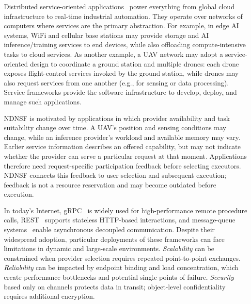 Distributed service-oriented applications~\cite{channabasavaiah2003migrating} power everything from global cloud infrastructure to real-time industrial automation.  They operate over networks of computers where services are the primary abstraction. For example, in edge AI systems, WiFi and cellular base stations may provide storage and AI inference/training services to end devices, while also offloading compute-intensive tasks to cloud services. As another example, a UAV network may adopt a service-oriented design to coordinate a ground station and multiple drones: each drone exposes flight-control services invoked by the ground station, while drones may also request services from one another (e.g., for sensing or data processing).  Service frameworks provide the software infrastructure to develop, deploy, and manage such applications.

NDNSF is motivated by applications in which provider availability and task suitability change over time. A UAV's position and sensing conditions may change, while an inference provider's workload and available memory may vary. Earlier service information describes an offered capability, but may not indicate whether the provider can serve a particular request at that moment. Applications therefore need request-specific participation feedback before selecting executors. NDNSF connects this feedback to user selection and subsequent execution; feedback is not a resource reservation and may become outdated before execution.

In today’s Internet, gRPC~\cite{grpc} is widely used for high-performance remote procedure calls, REST~\cite{fielding2000architectural} supports stateless HTTP-based interactions, and message-queue systems~\cite{john2017mqsurvey} enable asynchronous decoupled communication. Despite their widespread adoption, particular deployments of these frameworks can face limitations in dynamic and large-scale environments. \emph{Scalability} can be constrained when provider selection requires repeated point-to-point exchanges. \emph{Reliability} can be impacted by endpoint binding and load concentration, which create performance bottlenecks and potential single points of failure. \emph{Security} based only on channels protects data in transit; object-level confidentiality requires additional encryption.

